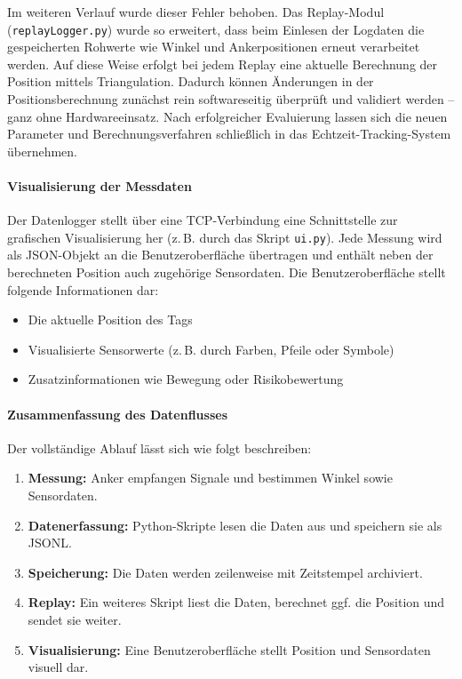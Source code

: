 \documentclass[a4paper, 12pt]{article} %
\begin{document}
Im weiteren Verlauf wurde dieser Fehler behoben. Das Replay-Modul (\texttt{replayLogger.py}) wurde so erweitert, dass beim Einlesen der Logdaten die gespeicherten Rohwerte wie Winkel und Ankerpositionen erneut verarbeitet werden. Auf diese Weise erfolgt bei jedem Replay eine aktuelle Berechnung der Position mittels Triangulation. Dadurch können Änderungen in der Positionsberechnung zunächst rein softwareseitig überprüft und validiert werden – ganz ohne Hardwareeinsatz. Nach erfolgreicher Evaluierung lassen sich die neuen Parameter und Berechnungsverfahren schließlich in das Echtzeit-Tracking-System übernehmen.

\paragraph{Visualisierung der Messdaten}

Der Datenlogger stellt über eine TCP-Verbindung eine Schnittstelle zur grafischen Visualisierung her (z.\,B. durch das Skript \texttt{ui.py}). 
Jede Messung wird als JSON-Objekt an die Benutzeroberfläche übertragen und enthält neben der berechneten Position auch zugehörige Sensordaten. 
Die Benutzeroberfläche stellt folgende Informationen dar:

\begin{itemize}
    \item Die aktuelle Position des Tags
    \item Visualisierte Sensorwerte (z.\,B. durch Farben, Pfeile oder Symbole)
    \item Zusatzinformationen wie Bewegung oder Risikobewertung
\end{itemize}

\paragraph{Zusammenfassung des Datenflusses}

Der vollständige Ablauf lässt sich wie folgt beschreiben:

\begin{enumerate}
    \item \textbf{Messung:} Anker empfangen Signale und bestimmen Winkel sowie Sensordaten.
    \item \textbf{Datenerfassung:} Python-Skripte lesen die Daten aus und speichern sie als JSONL.
    \item \textbf{Speicherung:} Die Daten werden zeilenweise mit Zeitstempel archiviert.
    \item \textbf{Replay:} Ein weiteres Skript liest die Daten, berechnet ggf. die Position und sendet sie weiter.
    \item \textbf{Visualisierung:} Eine Benutzeroberfläche stellt Position und Sensordaten visuell dar.
\end{enumerate}
\end{document}
